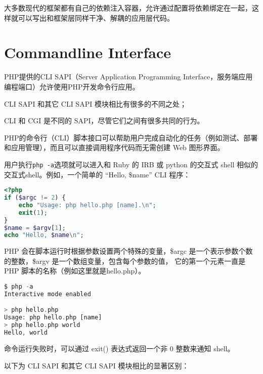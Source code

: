 大多数现代的框架都有自己的依赖注入容器，允许通过配置将依赖绑定在一起，这样就可以写出和框架层同样干净、解耦的应用层代码。


\section{Commandline Interface}


PHP提供的CLI SAPI（Server Application Programming Interface，服务端应用编程端口）允许使用PHP开发命令行应用。

\begin{compactitem}
\item CLI SAPI 和其它 CLI SAPI 模块相比有很多的不同之处；
\item CLI 和 CGI 是不同的 SAPI，尽管它们之间有很多共同的行为。
\end{compactitem}

PHP的命令行（CLI）脚本接口可以帮助用户完成自动化的任务（例如测试、部署和应用管理），而且可以直接调用程序代码而无需创建 Web 图形界面。

用户执行\texttt{php -a}选项就可以进入和 Ruby 的 IRB 或 python 的交互式 shell 相似的交互式shell。例如，一个简单的 “Hello, \$name” CLI 程序：


\begin{lstlisting}[language=PHP]
<?php
if ($argc != 2) {
    echo "Usage: php hello.php [name].\n";
    exit(1);
}
$name = $argv[1];
echo "Hello, $name\n";
\end{lstlisting}

PHP 会在脚本运行时根据参数设置两个特殊的变量，\$argc 是一个表示参数个数的整数，\$argv 是一个数组变量，包含每个参数的值， 它的第一个元素一直是 PHP 脚本的名称（例如这里就是hello.php）。

\begin{lstlisting}[language=PHP]
$ php -a
Interactive mode enabled

> php hello.php
Usage: php hello.php [name]
> php hello.php world
Hello, world
\end{lstlisting}

命令运行失败时，可以通过 exit() 表达式返回一个非 0 整数来通知 shell。

以下为 CLI SAPI 和其它 CLI SAPI 模块相比的显著区别：

